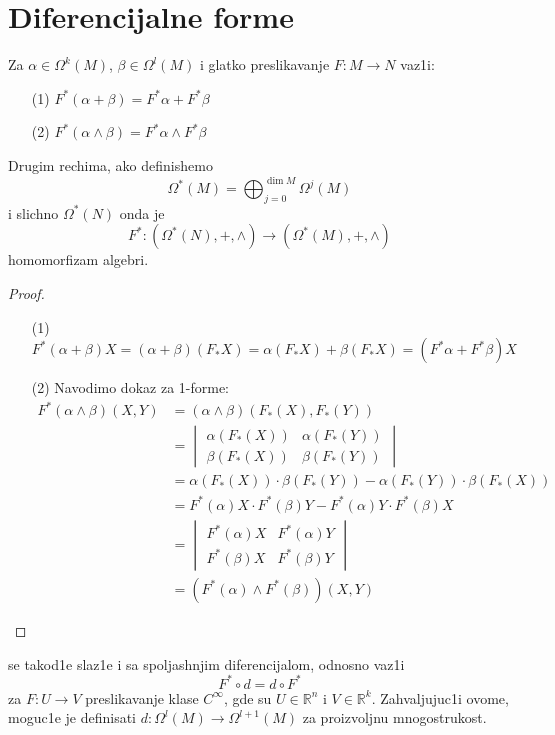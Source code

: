 \documentclass[a4paper,12pt]{article}
\newcommand{\latin}{\fontencoding{T1}\selectfont}
\newcommand{\RR}{\mathbb{R}}
\begin{document}
\section{Diferencijalne forme}

\begin{tvr}
Za $\alpha \in \Omega^k(M)$, $\beta \in \Omega^l(M)$ i glatko preslikavanje $F: M \to N$ vaz1i:
\begin{itemize}
\item[(1)] $F^* (\alpha + \beta) = F^* \alpha + F^* \beta$
\item[(2)] $F^* (\alpha \wedge \beta) = F^* \alpha \wedge F^* \beta$
\end{itemize}
Drugim rechima, ako definishemo \[\Omega^*(M) = \bigoplus^{\dim M}_{j=0} \Omega^j (M)\] i slichno $\Omega^*(N) $ onda je 
\[F^*: (\Omega^*(N), +, \wedge) \to (\Omega^*(M), +, \wedge)\]
homomorfizam algebri.
\end{tvr}

\begin{proof}
\begin{itemize}
\item[(1)] $F^*(\alpha + \beta) X = (\alpha + \beta) (F_* X) = \alpha(F_* X) + \beta(F_* X) = (F^* \alpha + F^* \beta) X$
\item[(2)] Navodimo dokaz za 1-forme:
\begin{align*}
 F^* (\alpha \wedge \beta) (X,Y) &= (\alpha \wedge \beta) (F_* (X), F_* (Y)) \\
 &= \begin{vmatrix} \alpha(F_*(X)) & \alpha(F_*(Y)) \\ \beta(F_*(X)) & \beta(F_*(Y)) \end{vmatrix} \\
 &= \alpha(F_*(X))\cdot \beta(F_*(Y)) - \alpha(F_*(Y)) \cdot \beta(F_*(X)) \\
 &= F^*(\alpha) X \cdot F^*(\beta) Y - F^*(\alpha) Y \cdot F^*(\beta) X \\
 &=  \begin{vmatrix} F^*(\alpha)X & F^*(\alpha)Y \\ F^*(\beta)X & F^*(\beta)Y \end{vmatrix} \\
 &= (F^*(\alpha) \wedge F^*(\beta))(X,Y)
\end{align*}
\end{itemize}
\end{proof}

\begin{tvr} \latin{Pullback} \selectfont se takod1e slaz1e i sa spoljashnjim diferencijalom, odnosno vaz1i \[F^* \circ d  = d \circ F^* \]
za $F: U \to V$ preslikavanje klase $C^{\infty}$, gde su $U \in \RR^n$ i $V \in \RR^k$.
 Zahvaljujuc1i ovome, moguc1e je definisati $d: \Omega^l(M) \to \Omega^{l+1}(M)$ za proizvoljnu mno\-go\-stru\-kost. 
\end{tvr}
\end{document}
